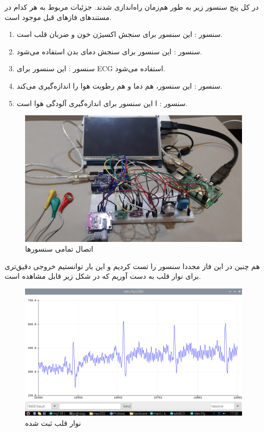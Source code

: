 \documentclass[12pt]{article}
\begin{document}
در کل پنج سنسور زیر به طور هم‌زمان راه‌اندازی شدند. جزئیات مربوط به هر کدام در مستندهای فازهای قبل موجود است.

\begin{enumerate}
	\item 
	سنسور : این سنسور برای سنجش اکسیژن خون و ضربان قلب است.
	
	\item 
	سنسور : این سنسور برای سنجش دمای بدن استفاده می‌شود.
	
	\item 
	سنسور : این سنسور برای ECG استفاده می‌شود.
	
	\item 
	سنسور : این سنسور، هم دما و هم رطوبت هوا را اندازه‌گیری می‌کند.
	
	\item 
	سنسور : ا این سنسور برای اندازه‌گیری آلودگی هوا است. 
\end{enumerate}




\begin{figure}[H]
	\begin{center}
		\includegraphics[width=.80\textwidth]{images/sensors-3.jpg}
	\end{center}
	\caption{اتصال تمامی سنسورها}
\end{figure}

هم چنین در این فاز مجددا سنسور 
را تست کردیم و این بار توانستیم خروجی دقیق‌تری برای نوار قلب به دست آوریم که در شکل زیر قابل مشاهده است.

\begin{figure}[H]
	\begin{center}
		\includegraphics[width=.80\textwidth]{images/ecg-1.png}
	\end{center}
	\caption{
نوار قلب ثبت شده
}
\end{figure}
\end{document}
